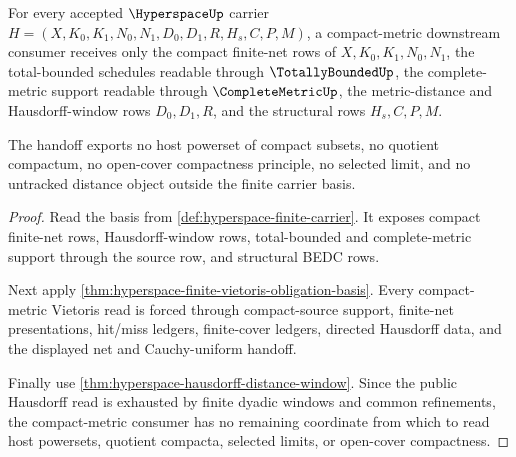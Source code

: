 \begin{theorem}
\label{thm:hyperspace-compactmetric-handoff}
For every accepted $\HyperspaceUp$ carrier $H=(X,K_0,K_1,N_0,N_1,D_0,D_1,R,H_s,C,P,M)$, a compact-metric downstream consumer receives only the compact finite-net rows of $X,K_0,K_1,N_0,N_1$, the total-bounded schedules readable through $\TotallyBoundedUp$, the complete-metric support readable through $\CompleteMetricUp$, the metric-distance and Hausdorff-window rows $D_0,D_1,R$, and the structural rows $H_s,C,P,M$.

The handoff exports no host powerset of compact subsets, no quotient compactum, no open-cover compactness principle, no selected limit, and no untracked distance object outside the finite carrier basis.
\end{theorem}
\begin{proof}
Read the basis from \autoref{def:hyperspace-finite-carrier}. It exposes compact finite-net rows, Hausdorff-window rows, total-bounded and complete-metric support through the source row, and structural BEDC rows.

Next apply \autoref{thm:hyperspace-finite-vietoris-obligation-basis}. Every compact-metric Vietoris read is forced through compact-source support, finite-net presentations, hit/miss ledgers, finite-cover ledgers, directed Hausdorff data, and the displayed net and Cauchy-uniform handoff.

Finally use \autoref{thm:hyperspace-hausdorff-distance-window}. Since the public Hausdorff read is exhausted by finite dyadic windows and common refinements, the compact-metric consumer has no remaining coordinate from which to read host powersets, quotient compacta, selected limits, or open-cover compactness.
\end{proof}

